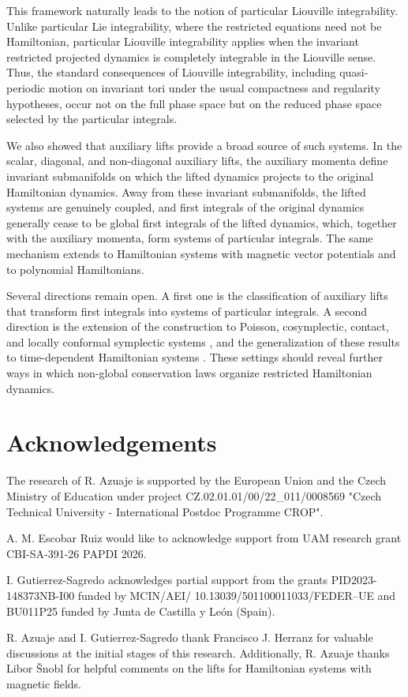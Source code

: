 \documentclass[10pt,a4paper]{article}
\begin{document}
This framework naturally leads to the notion of particular Liouville integrability. Unlike particular Lie integrability, where the restricted equations need not be Hamiltonian, particular Liouville integrability applies when the invariant restricted projected dynamics is completely integrable in the Liouville sense. Thus, the standard consequences of Liouville integrability, including quasi-periodic motion on invariant tori under the usual compactness and regularity hypotheses, occur not on the full phase space but on the reduced phase space selected by the particular integrals.

We also showed that auxiliary lifts provide a broad source of such systems. In the scalar, diagonal, and non-diagonal auxiliary lifts, the auxiliary momenta define invariant submanifolds on which the lifted dynamics projects to the original Hamiltonian dynamics. Away from these invariant submanifolds, the lifted systems are genuinely coupled, and first integrals of the original dynamics generally cease to be global first integrals of the lifted dynamics, which, together with the auxiliary momenta, form systems of particular integrals. The same mechanism extends to Hamiltonian systems with magnetic vector potentials and to polynomial Hamiltonians.

Several directions remain open. A first one is the classification of auxiliary lifts that transform first integrals into systems of particular integrals. A second direction is the extension of the construction to Poisson, cosymplectic, contact, and locally conformal symplectic systems \cite{deLeon_2024}, and the generalization of these results to time-dependent Hamiltonian systems \cite{ALBERT1989627,GUTIERREZSAGREDO2025105492}. These settings should reveal further ways in which non-global conservation laws organize restricted Hamiltonian dynamics.




\section*{Acknowledgements}

The research of R. Azuaje is supported by the European Union and the Czech Ministry of Education under project CZ.02.01.01/00/22\_011/0008569 "Czech Technical University - International Postdoc Programme CROP".

A. M. Escobar Ruiz would like to acknowledge support from UAM research grant CBI-SA-391-26 PAPDI 2026.

I. Gutierrez-Sagredo acknowledges partial support from the grants PID2023-148373NB-I00 funded by MCIN/AEI/ 10.13039/501100011033/FEDER–UE and BU011P25 funded by Junta de Castilla y León (Spain).

R. Azuaje and I. Gutierrez-Sagredo thank Francisco J. Herranz for valuable discussions at the initial stages of this research. Additionally, R. Azuaje thanks Libor \v{S}nobl for helpful comments on the lifts for Hamiltonian systems with magnetic fields.



\end{document}
